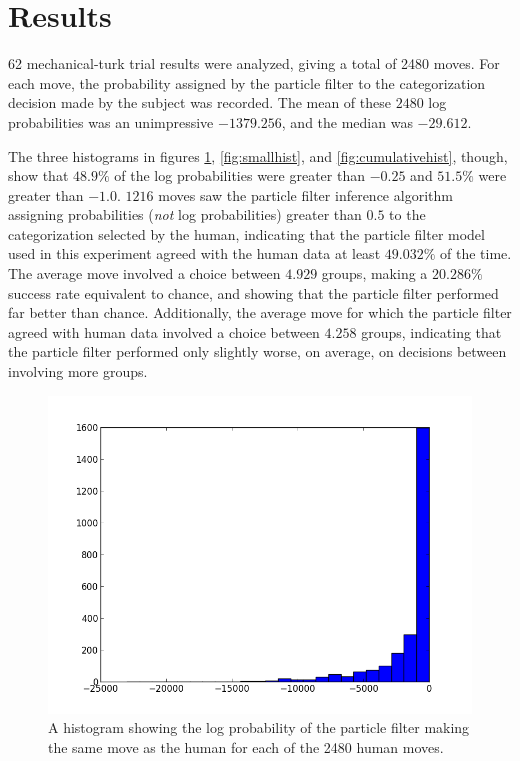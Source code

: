 \section{Results}
\label{sec:results}

62 mechanical-turk trial results were analyzed, giving a total of 2480 moves.
For each move, the probability assigned by the particle filter to the
categorization decision made by the subject was recorded. The mean of these
$2480$ log probabilities was an unimpressive $-1379.256$, and the median was
$-29.612$.

The three histograms in figures \ref{fig:fullhist}, \ref{fig:smallhist}, and
\ref{fig:cumulativehist}, though, show that $48.9\%$ of the
log probabilities were greater than $-0.25$ and $51.5\%$ were greater than
$-1.0$. $1216$ moves saw the particle filter inference algorithm assigning
probabilities (\emph{not} log probabilities) greater than $0.5$ to the
categorization selected by the human, indicating that the particle filter model
used in this experiment agreed with the human data at least $49.032\%$ of the
time. The average move involved a choice between $4.929$ groups, making a
$20.286\%$ success rate equivalent to chance, and showing that the particle
filter performed far better than chance. Additionally, the average move for
which the particle filter agreed with human data involved a choice between
$4.258$ groups, indicating that the particle filter performed only slightly
worse, on average, on decisions between involving more groups.

\begin{figure}
\centering
\includegraphics[scale=0.75]{img/hist0.png}
\caption{A histogram showing the log probability of the particle filter making
the same move as the human for each of the 2480 human moves.}
\label{fig:fullhist}
\end{figure}

